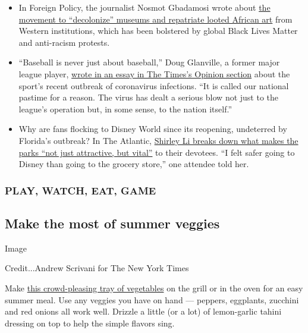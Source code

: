 \begin{itemize}
\item
  In Foreign Policy, the journalist Nosmot Gbadamosi wrote about
  \href{https://foreignpolicy.com/2020/07/28/time-repatriate-africa-looted-art-artifacts-cultural-heritage-benin-bronzes-nigeria-ghana-europe-british-museum/}{the
  movement to ``decolonize'' museums and repatriate looted African art}
  from Western institutions, which has been bolstered by global Black
  Lives Matter and anti-racism protests.
\item
  ``Baseball is never just about baseball,'' Doug Glanville, a former
  major league player,
  \href{https://www.nytimes.com/2020/08/02/opinion/baseball-coronavirus-Marlins.html}{wrote
  in an essay in The Times's Opinion section} about the sport's recent
  outbreak of coronavirus infections. ``It is called our national
  pastime for a reason. The virus has dealt a serious blow not just to
  the league's operation but, in some sense, to the nation itself.''
\item
  Why are fans flocking to Disney World since its reopening, undeterred
  by Florida's outbreak? In The Atlantic,
  \href{https://www.theatlantic.com/culture/archive/2020/08/when-disney-world-essential-destination/614890/}{Shirley
  Li breaks down what makes the parks ``not just attractive, but
  vital''} to their devotees. ``I felt safer going to Disney than going
  to the grocery store,'' one attendee told her.
\end{itemize}

\hypertarget{play-watch-eat-game}{%
\subsubsection{\texorpdfstring{\textbf{PLAY, WATCH, EAT,
GAME}}{PLAY, WATCH, EAT, GAME}}\label{play-watch-eat-game}}

\hypertarget{make-the-most-of-summer-veggies}{%
\subsection{Make the most of summer
veggies}\label{make-the-most-of-summer-veggies}}

Image

Credit...Andrew Scrivani for The New York Times

Make
\href{https://cooking.nytimes.com/recipes/1020382-grilled-summer-vegetables-with-tahini-dressing}{this
crowd-pleasing tray of vegetables} on the grill or in the oven for an
easy summer meal. Use any veggies you have on hand --- peppers,
eggplants, zucchini and red onions all work well. Drizzle a little (or a
lot) of lemon-garlic tahini dressing on top to help the simple flavors
sing.

